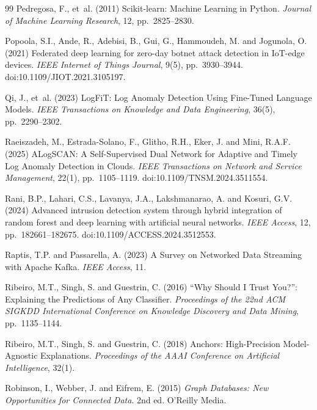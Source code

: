 \documentclass[12pt,a4paper]{report}
\begin{document}
\begin{thebibliography}{99}
Pedregosa, F., et~al. (2011) Scikit-learn: Machine Learning in Python. \textit{Journal of Machine Learning Research}, 12, pp.~2825--2830.

Popoola, S.I., Ande, R., Adebisi, B., Gui, G., Hammoudeh, M. and Jogunola, O. (2021) Federated deep learning for zero-day botnet attack detection in IoT-edge devices. \textit{IEEE Internet of Things Journal}, 9(5), pp.~3930--3944. doi:10.1109/JIOT.2021.3105197.

Qi, J., et~al. (2023) LogFiT: Log Anomaly Detection Using Fine-Tuned Language Models. \textit{IEEE Transactions on Knowledge and Data Engineering}, 36(5), pp.~2290--2302.

Raeiszadeh, M., Estrada-Solano, F., Glitho, R.H., Eker, J. and Mini, R.A.F. (2025) ALogSCAN: A Self-Supervised Dual Network for Adaptive and Timely Log Anomaly Detection in Clouds. \textit{IEEE Transactions on Network and Service Management}, 22(1), pp.~1105--1119. doi:10.1109/TNSM.2024.3511554.

Rani, B.P., Lahari, C.S., Lavanya, J.A., Lakshmanarao, A. and Kosuri, G.V. (2024) Advanced intrusion detection system through hybrid integration of random forest and deep learning with artificial neural networks. \textit{IEEE Access}, 12, pp.~182661--182675. doi:10.1109/ACCESS.2024.3512553.

Raptis, T.P. and Passarella, A. (2023) A Survey on Networked Data Streaming with Apache Kafka. \textit{IEEE Access}, 11.

Ribeiro, M.T., Singh, S. and Guestrin, C. (2016) ``Why Should I Trust You?'': Explaining the Predictions of Any Classifier. \textit{Proceedings of the 22nd ACM SIGKDD International Conference on Knowledge Discovery and Data Mining}, pp.~1135--1144.

Ribeiro, M.T., Singh, S. and Guestrin, C. (2018) Anchors: High-Precision Model-Agnostic Explanations. \textit{Proceedings of the AAAI Conference on Artificial Intelligence}, 32(1).

Robinson, I., Webber, J. and Eifrem, E. (2015) \textit{Graph Databases: New Opportunities for Connected Data}. 2nd ed. O'Reilly Media.


\end{thebibliography}
\end{document}
